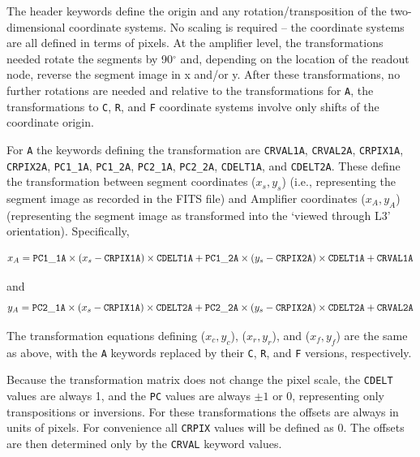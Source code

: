 \documentclass{article}[12pt]
\begin{document}
{The header keywords define the origin and any rotation/transposition of the two-dimensional coordinate systems.   No scaling is required -- the coordinate systems are all defined in terms of pixels.  At the amplifier level, the transformations needed rotate the segments by 90$^\circ$ and, depending on the location of the readout node, reverse the segment image in x and/or y.  After these transformations, no further rotations are needed and relative to the transformations for {\tt A}, the transformations to {\tt C}, {\tt R}, and {\tt F} coordinate systems involve only shifts of the coordinate origin.

For {\tt A} the keywords defining the transformation are {\tt CRVAL1A}, {\tt CRVAL2A}, {\tt CRPIX1A}, {\tt CRPIX2A}, {\tt PC1\_1A}, {\tt PC1\_2A}, {\tt PC2\_1A}, {\tt PC2\_2A}, {\tt CDELT1A}, and {\tt CDELT2A}.  These define the transformation between segment coordinates ($x_s, y_s$) (i.e., representing the segment image as recorded in the FITS file) and Amplifier coordinates ($x_A, y_A$) (representing the segment image as transformed into the `viewed through L3' orientation).  Specifically,

\begin{equation}
x_A = {\tt PC1\_1A} \times (x_s -{\tt CRPIX1A}) \times {\tt CDELT1A} + {\tt PC1\_2A} \times (y_s - {\tt CRPIX2A}) \times {\tt CDELT1A} + {\tt CRVAL1A}
\end{equation}

and
\begin{equation}
y_A = {\tt PC2\_1A} \times (x_s - {\tt CRPIX1A}) \times {\tt CDELT2A} + {\tt PC2\_2A} \times (y_s - {\tt CRPIX2A}) \times {\tt CDELT2A} + {\tt CRVAL2A}
\end{equation}

The transformation equations defining ($x_c, y_c$), ($x_r, y_r$), and ($x_f, y_f$) are the same as above, with the {\tt A} keywords replaced by their {\tt C}, {\tt R}, and {\tt F} versions, respectively.

Because the transformation matrix does not change the pixel scale, the {\tt CDELT} values are always 1, and the {\tt PC} values are always $\pm1$ or 0, representing only transpositions or inversions.  For these transformations the offsets are always in units of pixels.  For convenience all {\tt CRPIX} values will be defined as 0.  The offsets are then determined only by the {\tt CRVAL} keyword values.

}
\end{document}
